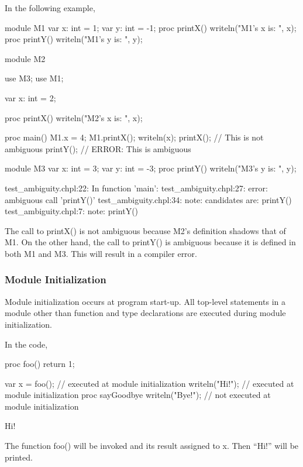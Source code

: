 \begin{example}
In the following example,
\begin{chapelpre}
\end{chapelpre}
\begin{chapel}
module M1 {
  var x: int = 1;
  var y: int = -1;
  proc printX() {
    writeln("M1's x is: ", x);
  }
  proc printY() {
    writeln("M1's y is: ", y);
  }
}
 
module M2 {
  use M3;
  use M1;

  var x: int = 2;

  proc printX() {
    writeln("M2's x is: ", x);
  }

  proc main() {
    M1.x = 4;
    M1.printX();
    writeln(x);
    printX(); // This is not ambiguous
    printY(); // ERROR: This is ambiguous
  }
}

module M3 {
  var x: int = 3;
  var y: int = -3;
  proc printY() {
    writeln("M3's y is: ", y);
  }
}
\end{chapel}
\begin{chapeloutput}
test\_ambiguity.chpl:22: In function 'main':
test\_ambiguity.chpl:27: error: ambiguous call 'printY()'
test\_ambiguity.chpl:34: note: candidates are: printY()
test\_ambiguity.chpl:7: note:                 printY()
\end{chapeloutput}
The call to printX() is not ambiguous because M2's definition shadows
that of M1.  On the other hand, the call to printY() is ambiguous
because it is defined in both M1 and M3.  This will result in a
compiler error.
\end{example}


\subsubsection{Module Initialization}
\label{Module_Initialization}

Module initialization occurs at program start-up.  All top-level
statements in a module other than function and type declarations are
executed during module initialization.

\begin{example}
In the code,
\begin{chapelpre}
proc foo() {
    return 1;
}
\end{chapelpre}
\begin{chapel}
var x = foo();       // executed at module initialization
writeln("Hi!");      // executed at module initialization
proc sayGoodbye {
  writeln("Bye!");   // not executed at module initialization
}
\end{chapel}
\begin{chapeloutput}
Hi!
\end{chapeloutput}
The function foo() will be invoked and its result assigned to x.  Then
``Hi!'' will be printed.
\end{example}

